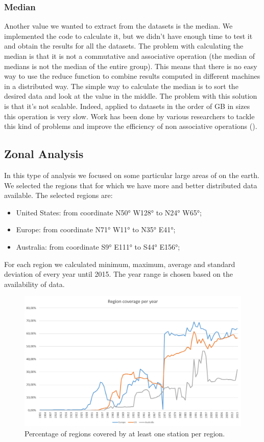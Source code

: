 \documentclass{vldb}
\begin{document}
\subsubsection{Median}
Another value we wanted to extract from the datasets is the median. We implemented the code to calculate it, but we didn't have enough time to test it and obtain the results for all the datasets. The problem with calculating the median is that it is not a commutative and associative operation (the median of medians is not the median of the entire group). This means that there is no easy way to use the reduce function to combine results computed in different machines in a distributed way. The simple way to calculate the median is to sort the desired data and look at the value in the middle. The problem with this solution is that it's not scalable. Indeed, applied to datasets in the order of GB in sizes this operation is very slow. Work has been done by various researchers to tackle this kind of problems and improve the efficiency of non associative operations (\cite{liu2009computing}).


\subsection{Zonal Analysis}
In this type of analysis we focused on some particular large areas of on the earth. We selected the regions that for which we have more and better distributed data available. The selected regions are:
\begin{itemize}
    \item United States: from coordinate N\ang{50;;} W\ang{128;;} to N\ang{24;;} W\ang{65;;};
    \item Europe: from coordinate N\ang{71;;} W\ang{11;;} to N\ang{35;;} E\ang{41;;};
    \item Australia: from coordinate S\ang{9;;} E\ang{111;;} to S\ang{44;;} E\ang{156;;};
\end{itemize}
For each region we calculated minimum, maximum, average and standard deviation of every year until 2015. The year range is chosen based on the availability of data. 

\begin{figure}[tbh]
\includegraphics[width=1\linewidth]{stationsRegion}
\caption{Percentage of regions covered by at least one station per region.}
\label{fig:stationsRegion}
\end{figure}
\end{document}
